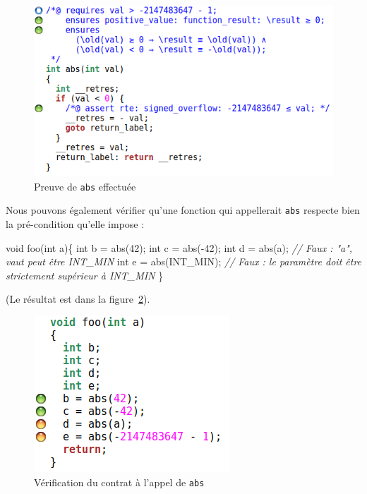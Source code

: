 \documentclass[12pt,francais,]{scrbook}
\newenvironment{Shaded}{}{}
\newcommand{\DataTypeTok}[1]{\textcolor[rgb]{0.56,0.13,0.00}{{#1}}}
\newcommand{\DecValTok}[1]{\textcolor[rgb]{0.25,0.63,0.44}{{#1}}}
\newcommand{\CommentTok}[1]{\textcolor[rgb]{0.38,0.63,0.69}{\textit{{#1}}}}
\newcommand{\NormalTok}[1]{{#1}}
\begin{document}
\begin{figure}[htbp]
\centering
\includegraphics[scale=0.5]{2-1-2-abs-1.png}
\caption{Preuve de \texttt{abs} effectuée}
\label{fig:2-1-2-abs-1}
\end{figure}

Nous pouvons également vérifier qu'une fonction qui appellerait
\texttt{abs} respecte bien la pré-condition qu'elle impose :

\begin{footnotesize}\begin{Shaded}
\begin{Highlighting}[]
\DataTypeTok{void} \NormalTok{foo(}\DataTypeTok{int} \NormalTok{a)\{}
   \DataTypeTok{int} \NormalTok{b = abs(}\DecValTok{42}\NormalTok{);}
   \DataTypeTok{int} \NormalTok{c = abs(-}\DecValTok{42}\NormalTok{);}
   \DataTypeTok{int} \NormalTok{d = abs(a);       }\CommentTok{// Faux : "a", vaut peut être INT_MIN}
   \DataTypeTok{int} \NormalTok{e = abs(INT_MIN); }\CommentTok{// Faux : le paramètre doit être strictement supérieur à INT_MIN}
\NormalTok{\}}
\end{Highlighting}
\end{Shaded}\end{footnotesize}

(Le résultat est dans la figure~\ref{fig:2-1-2-foo-1}).

\begin{figure}[htbp]
\centering
\includegraphics[scale=0.5]{2-1-2-foo-1.png}
\caption{Vérification du contrat à l'appel de \texttt{abs}}
\label{fig:2-1-2-foo-1}
\end{figure}
\end{document}
